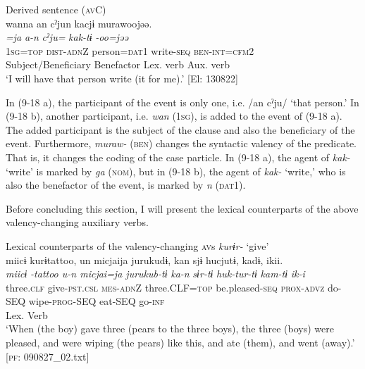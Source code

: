   \ex  Derived sentence (\textsc{av}C)\label{ex:9.18b}\\
      \gllll wanna  an  cˀjun  kacjɨ   murawoojəə.\\
      \textit{=ja}  \textit{a-n}  \textit{cˀju=}  \textit{kak-tɨ}      \textit{-oo=jəə}\\
      1\textsc{sg}=\textsc{top}  \textsc{dist}-\textsc{adn}Z  person=\textsc{dat}1  write-\textsc{seq}   \textsc{ben}-\textsc{int}=\textsc{cfm}2\\
      Subject/Beneficiary Benefactor  Lex. verb  Aux. verb \\      
      \glt ‘I will have that person write (it for me).’       [El: 130822]
    \z
\z

In (9-18 a), the participant of the event is only one, i.e. /an cˀju/ ‘that person.’ In (9-18 b), another participant, i.e. \textit{wan} (1\textsc{sg}), is added to the event of (9-18 a). The added participant is the subject of the clause and also the beneficiary of the event. Furthermore, \textit{muraw-} (\textsc{ben}) changes the syntactic valency of the predicate. That is, it changes the coding of the case particle. In (9-18 a), the agent of \textit{kak-} ‘write’ is marked by \textit{ga} (\textsc{nom}), but in (9-18 b), the agent of \textit{kak-} ‘write,’ who is also the benefactor of the event, is marked by \textit{n} (\textsc{dat}1).

  Before concluding this section, I will present the lexical counterparts of the above valency-changing auxiliary verbs.

\ea   Lexical counterparts of the valency-changing \textsc{av}s \label{ex:9.19}
\ea \textit{kurɨr-} ‘give’\\
   \gllll miicɨ  kurɨtattoo,  un  micjaija  jurukudɨ, kan  sjɨ  hucjutɨ,  kadɨ,  ikii.\\
    \textit{miicɨ}  \textit{-tattoo  u-n  micjai=ja  jurukub-tɨ}  \textit{ka-n}  \textit{sɨr-tɨ}  \textit{huk-tur-tɨ}  \textit{kam-tɨ}  \textit{ik-i}\\
    three.\textsc{clf}  give-\textsc{pst}.\textsc{csl}  \textsc{mes}-\textsc{adn}Z  three.CLF=\textsc{top}  be.pleased-\textsc{seq}  \textsc{prox}-\textsc{advz}  do-SEQ  wipe-\textsc{prog}-SEQ  eat-SEQ  go-\textsc{inf}\\
      Lex. Verb    \\
    \glt  ‘When (the boy) gave three (pears to the three boys), the three (boys) were pleased, and were wiping (the pears) like this, and ate (them), and went (away).’   [\textsc{pf}: 090827\_02.txt]

